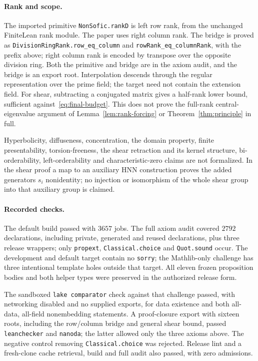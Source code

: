 \paragraph{Rank and scope.}
The imported primitive \texttt{NonSofic.rankD} is left row rank, from
the unchanged FiniteLean rank module. The paper uses right column rank.
The bridge is proved as \nolinkurl{DivisionRingRank.row_eq_column} and
\nolinkurl{rowRank_eq_columnRank}, with the prefix above; right column
rank is encoded by transpose over the opposite division ring. Both the
primitive and bridge are in the axiom audit, and the bridge is an
export root. Interpolation descends through the regular representation
over the prime field; the target need not contain the extension field.
For shear, subtracting a conjugated matrix gives a half-rank lower
bound, sufficient against~\eqref{eq:final-budget}. This does not prove
the full-rank central-eigenvalue argument of
Lemma~\ref{lem:rank-forcing} or Theorem~\ref{thm:principle} in full.

Hyperbolicity, diffuseness, concentration, the domain property, finite
presentability, torsion-freeness, the shear retraction and its kernel
structure, bi-orderability, left-orderability and characteristic-zero
claims are not formalized. In the shear proof a map to an auxiliary
HNN construction proves the added generators \(s_i\) nonidentity;
no injection or isomorphism of the whole shear group into that
auxiliary group is claimed.

\paragraph{Recorded checks.}
The default build passed with \(3657\) jobs. The full axiom audit
covered \(2792\) declarations, including private, generated and reused
declarations, plus three release wrappers; only \texttt{propext},
\texttt{Classical.choice} and \texttt{Quot.sound} occur. The development
and default target contain no \texttt{sorry}; the Mathlib-only challenge
has three intentional template holes outside that target. All eleven
frozen proposition bodies and both helper types were preserved in the
authorized release form.

The sandboxed \texttt{lake comparator} check against that challenge
passed, with networking disabled and no supplied exports, for data
existence and both all-data, all-field nonembedding statements. A
proof-closure export with sixteen roots, including the row/column
bridge and general shear bound, passed \texttt{leanchecker} and
\texttt{nanoda}; the latter allowed only the three axioms above.
The negative control removing \texttt{Classical.choice} was rejected.
Release lint and a fresh-clone cache retrieval, build and full audit
also passed, with zero admissions.


